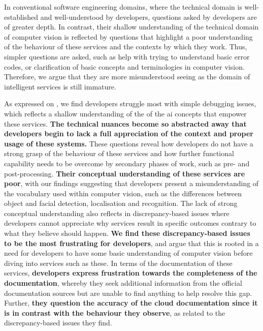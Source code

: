 \begin{callout}
In conventional software engineering domains, where the technical domain is well-established and well-understood by developers, questions asked by developers are of greater depth. In contrast, their shallow understanding of the technical domain of computer vision is reflected by questions that highlight a poor understanding of the behaviour of these services and the contexts by which they work. Thus, simpler questions are asked, such as help with trying to understand basic error codes, or clarification of basic concepts and terminologies in computer vision. Therefore, we argue that they are more misunderstood seeing as the domain of intelligent services is still immature.
\end{callout}
As expressed on , we find developers struggle most with simple debugging issues, which reflects a shallow understanding of the of the \gls{ai} concepts that empower these services. \textbf{The technical nuances become so abstracted away that developers begin to lack a full appreciation of the context and proper usage of these systems.} These questions reveal how developers do not have a strong grasp of the behaviour of these services and how further functional capability needs to be overcome by secondary phases of work, such as pre- and post-processing. \textbf{Their conceptual understanding of these services are poor}, with our findings suggesting that developers present a misunderstanding of the vocabulary used within computer vision, such as the differences between object and facial detection, localisation and recognition. The lack of strong conceptual understanding also reflects in discrepancy-based issues where developers cannot appreciate why services result in specific outcomes contrary to what they believe should happen.
\textbf{We find these discrepancy-based issues to be the most frustrating for developers}, and argue that this is rooted in a need for developers to have some basic understanding of computer vision before diving into services such as these. In terms of the documentation of these services, \textbf{developers express frustration towards the completeness of the documentation}, whereby they seek additional information from the official documentation sources but are unable to find anything to help resolve this gap. Further, \textbf{they question the accuracy of the cloud documentation since it is in contrast with the behaviour they observe}, as related to the discrepancy-based issues they find. 
